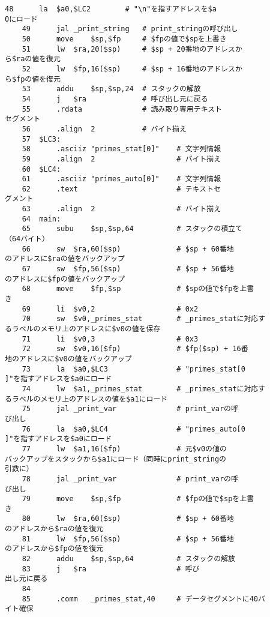 \begin{Verbatim}[fontsize=\small, baselinestretch=0.8]
    48		la	$a0,$LC2		# "\n"を指すアドレスを$a
0にロード
    49		jal	_print_string	# print_stringの呼び出し
    50		move	$sp,$fp		# $fpの値で$spを上書き
    51		lw	$ra,20($sp)		# $sp + 20番地のアドレスか
ら$raの値を復元
    52		lw	$fp,16($sp)		# $sp + 16番地のアドレスか
ら$fpの値を復元
    53		addu	$sp,$sp,24	# スタックの解放
    54		j	$ra				# 呼び出し元に戻る
    55		.rdata				# 読み取り専用テキスト
セグメント
    56		.align	2			# バイト揃え
    57	$LC3:
    58		.asciiz	"primes_stat[0]"	# 文字列情報
    59		.align	2					# バイト揃え
    60	$LC4:
    61		.asciiz	"primes_auto[0]"	# 文字列情報
    62		.text						# テキストセ
グメント
    63		.align	2					# バイト揃え
    64	main:
    65		subu	$sp,$sp,64			# スタックの積立て
（64バイト）
    66		sw	$ra,60($sp)				# $sp + 60番地
のアドレスに$raの値をバックアップ
    67		sw	$fp,56($sp)				# $sp + 56番地
のアドレスに$fpの値をバックアップ
    68		move	$fp,$sp				# $spの値で$fpを上書
き
    69		li	$v0,2					# 0x2
    70		sw	$v0,_primes_stat		# _primes_statに対応す
るラベルのメモリ上のアドレスに$v0の値を保存
    71		li	$v0,3					# 0x3
    72		sw	$v0,16($fp)				# $fp($sp) + 16番
地のアドレスに$v0の値をバックアップ
    73		la	$a0,$LC3				# "primes_stat[0
]"を指すアドレスを$a0にロード
    74		lw	$a1,_primes_stat		# _primes_statに対応す
るラベルのメモリ上のアドレスの値を$a1にロード
    75		jal	_print_var				# print_varの呼
び出し
    76		la	$a0,$LC4				# "primes_auto[0
]"を指すアドレスを$a0にロード
    77		lw	$a1,16($fp)				# 元$v0の値の
バックアップをスタックから$a1にロード（同時にprint_stringの
引数に）
    78		jal	_print_var				# print_varの呼
び出し
    79		move	$sp,$fp				# $fpの値で$spを上書
き
    80		lw	$ra,60($sp)				# $sp + 60番地
のアドレスから$raの値を復元
    81		lw	$fp,56($sp)				# $sp + 56番地
のアドレスから$fpの値を復元
    82		addu	$sp,$sp,64			# スタックの解放
    83		j	$ra						# 呼び
出し元に戻る
    84	
    85		.comm	_primes_stat,40		# データセグメントに40バ
イト確保

\end{Verbatim}


